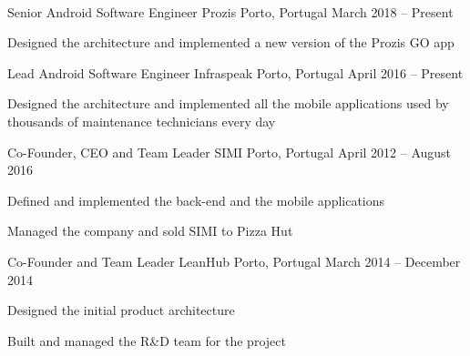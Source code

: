 \documentclass[]{awesome-cv}
\begin{document}
\begin{center}
	  \\
	
\end{center}
\vspace{-3mm}
\begin{cventries}

	\vspace{-2mm}
	\cventry
	{Senior Android Software Engineer}
	{Prozis}
	{Porto, Portugal}
	{March 2018 – Present}
	{\begin{cvitems}
		\item {Designed the architecture and implemented a new version of the Prozis GO app}
	\end{cvitems}}
	
	\vspace{-4mm}
	\cventry
	{Lead Android Software Engineer}
	{Infraspeak}
	{Porto, Portugal}
	{April 2016 – Present}
	{\begin{cvitems}
		\item {Designed the architecture and implemented all the mobile applications used by thousands of maintenance technicians every day}
		\end{cvitems}}
	
	\vspace{-4mm}
	\cventry
	{Co-Founder, CEO and Team Leader}
	{SIMI}
	{Porto, Portugal}
	{April 2012 – August 2016}
	{\begin{cvitems}
		\item {Defined and implemented the back-end and the mobile applications}
		\item {Managed the company and sold SIMI to Pizza Hut}
		\end{cvitems}}
	
	\vspace{-4mm}
	\cventry
	{Co-Founder and Team Leader}
	{LeanHub}
	{Porto, Portugal}
	{March 2014 – December 2014}
	{\begin{cvitems}
		\item {Designed the initial product architecture}
		\item {Built and managed the R\&D team for the project}
		\end{cvitems}}
	

\end{cventries}
\end{document}
